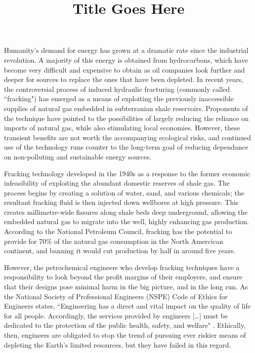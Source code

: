\documentclass[12pt,letterpaper]{article}
\title{Title Goes Here}
\begin{document}
\makeheader

Humanity's demand for energy has grown at a dramatic rate since the industrial revolution. A majority of this energy is obtained from hydrocarbons, which have become very difficult and expensive to obtain as oil companies look further and deeper for sources to replace the ones that have been depleted. In recent years, the controversial process of induced hydraulic fracturing (commonly called ``fracking") has emerged as a means of exploiting the previously inaccessible supplies of natural gas embedded in subterranian shale reservoirs. Proponents of the technique have pointed to the possibilities of largely reducing the reliance on imports of natural gas, while also stimulating local economies. However, these transient benefits are not worth the accompanying ecological risks, and continued use of the technology runs counter to the long-term goal of reducing dependance on non-polluting and sustainable energy sources.

Fracking technology developed in the 1940s as a response to the former economic infeasibility of exploiting the abundant domestic reserves of shale gas.
The process begins by creating a solution of water, sand, and various chemicals; the resultant fracking fluid is then injected down wellbores at high pressure. This creates millimetre-wide fissures along shale beds deep underground, allowing the embedded natural gas to migrate into the well, highly enhancing gas production. According to the National Petroleum Council, fracking has the potential to provide for 70\%  \cite{npc}  of the natural gas consumption in the North Amercican continent, and banning it would cut production by half in around five years.

However, the petrochemical engineers who develop fracking techniques have a responsibility to look beyond the profit margins of their employers, and ensure that their designs pose minimal harm in the big picture, and in the long run.
As the National Society of Professional Engineers (NSPE) Code of Ethics for Engineers states, 
``Engineering has a direct and vital impact on the quality of life for all people. Accordingly, the services provided by engineers [\ldots] must be dedicated to the protection of the public health, safety, and welfare" \cite{ethics}.
Ethically, then, engineers are obligated to stop the trend of pursuing ever riskier means of depleting the Earth's limited resources, but they have failed in this regard.
\end{document}
